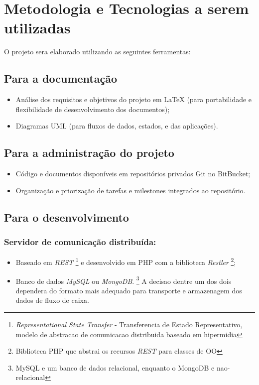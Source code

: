 \documentclass[a4paper]{abnt}
\begin{document}
\section{Metodologia e Tecnologias a serem utilizadas}
O projeto sera elaborado utilizando as seguintes ferramentas:

\subsection{Para a documentação}
\begin{itemize}
	\item Análise dos requisitos e objetivos do projeto em \LaTeX{} (para portabilidade e flexibilidade de desenvolvimento dos documentos);
	\item Diagramas UML (para fluxos de dados, estados, e das aplicações).
\end{itemize}
	
\subsection{Para a administração do projeto}
\begin{itemize}
	\item Código e documentos disponíveis em repositórios privados Git no BitBucket;
	\item Organização e priorização de tarefas e milestones integrados ao repositório.
\end{itemize}
	
\subsection{Para o desenvolvimento}

\subsubsection{Servidor de comunicação distribuída:}
\begin{itemize}
	\item
		Baseado em \emph{REST}
			\footnote{\emph{Representational State Transfer} - Transferencia de Estado 
				Representativo, modelo de abstracao de comunicacao distribuida baseado
				em hipermidia}
		e desenvolvido em PHP com a biblioteca \emph{Restler}
			\footnote{Biblioteca PHP que abstrai os recursos \emph{REST} para classes de OO};

		\item
		Banco de dados \emph{MySQL} ou \emph{MongoDB}.
			\footnote{MySQL e um banco de dados relacional, enquanto o MongoDB e nao-relacional}
		A decisao dentre um dos dois dependera do formato mais adequado para transporte
		e armazenagem dos dados de fluxo de caixa.
\end{itemize}
\end{document}
